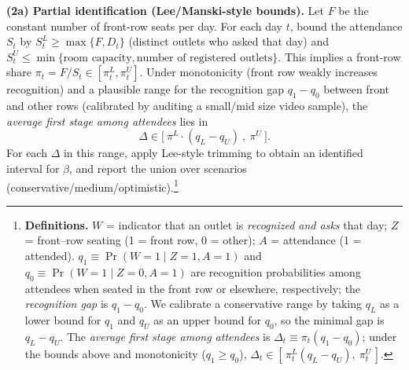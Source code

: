 \documentclass[11pt]{article}
\begin{document}
\textbf{(2a) Partial identification (Lee/Manski-style bounds).}
Let $F$ be the constant number of front-row seats per day. For each day $t$, bound the attendance $S_t$ by
$S_t^{L} \ge \max\{F, D_t\}$ (distinct outlets who asked that day) and $S_t^{U} \le \min\{\text{room capacity}, \text{number of registered outlets}\}$.
This implies a front-row share $\pi_t = F/S_t \in [\pi_t^L,\pi_t^U]$.
Under monotonicity (front row weakly increases recognition) and a plausible range for the recognition gap $q_1{-}q_0$ between front and other rows (calibrated by auditing a small/mid size video sample), the \emph{average first stage among attendees} lies in
\[
\Delta \in \big[\ \pi^L\!\cdot(q_L{-}q_U)\ ,\ \pi^U\ \big].
\] 
For each $\Delta$ in this range, apply Lee-style trimming to obtain an identified interval for $\beta$, and report the union over scenarios (conservative/medium/optimistic).\footnote{\textbf{Definitions.} 
$W$ = indicator that an outlet is \emph{recognized and asks} that day; 
$Z$ = front–row seating (1 = front row, 0 = other); 
$A$ = attendance (1 = attended). 
$q_1 \equiv \Pr(W{=}1\mid Z{=}1, A{=}1)$ and 
$q_0 \equiv \Pr(W{=}1\mid Z{=}0, A{=}1)$ are recognition probabilities among attendees when seated in the front row or elsewhere, respectively; the \emph{recognition gap} is $q_1 - q_0$. 
We calibrate a conservative range by taking $q_L$ as a lower bound for $q_1$ and $q_U$ as an upper bound for $q_0$, so the minimal gap is $q_L - q_U$. 
The \emph{average first stage among attendees} is $\Delta_t \equiv \pi_t (q_1 - q_0)$; under the bounds above and monotonicity ($q_1 \ge q_0$), 
$\Delta_t \in [\,\pi_t^{L}(q_L - q_U),\ \pi_t^{U}\,]$.}
\end{document}
